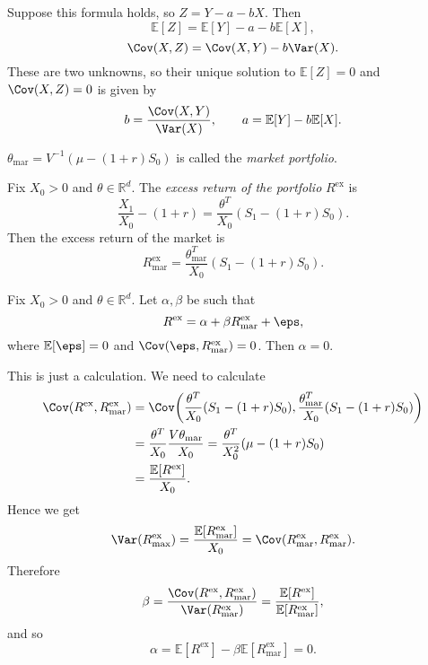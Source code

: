 \documentclass[12pt]{article}
\begin{document}
\begin{proofbox}
	Suppose this formula holds, so $Z = Y - a - bX$. Then
	\[
	\mathbb{E}[Z] = \mathbb{E}[Y] - a - b \mathbb{E}[X],
	\]
	\[
	\Cov(X, Z) = \Cov(X, Y) - b \Var(X).
	\]
	These are two unknowns, so their unique solution to $\mathbb{E}[Z] = 0$ and $\Cov(X, Z) = 0$ is given by
	\[
	b = \frac{\Cov(X, Y)}{\Var(X)}, \qquad a = \mathbb{E}[Y] - b \mathbb{E}[X].
	\]
\end{proofbox}

\begin{definition}
	$\theta_{\mathrm{mar}} = V^{-1}(\mu - (1+r)S_0)$ is called the \emph{market portfolio}.
\end{definition}

\begin{definition}
	Fix $X_0 > 0$ and $\theta \in \mathbb{R}^{d}$. The \emph{excess return of the portfolio} $R^{\mathrm{ex}}$ is
	\[
	\frac{X_1}{X_0} - (1+r) = \frac{\theta^{T}}{X_0}(S_1 - (1+r)S_0).
	\]
	Then the excess return of the market is
	\[
		R^{\mathrm{ex}}_{\mathrm{mar}} = \frac{\theta^{T}_{\mathrm{mar}}}{X_0}(S_1 - (1+r)S_0).
	\]
\end{definition}

\begin{theorem}
	Fix $X_0 > 0$ and $\theta \in \mathbb{R}^{d}$. Let $\alpha, \beta$ be such that
	\[
		R^{\mathrm{ex}} = \alpha + \beta R^{\mathrm{ex}}_{\mathrm{mar}} + \eps,
	\]
	where $\mathbb{E}[\eps] = 0$ and $\Cov(\eps, R^{\mathrm{ex}}_{\mathrm{mar}}) = 0$. Then $\alpha = 0$.
\end{theorem}


\begin{proofbox}
	This is just a calculation. We need to calculate
	\begin{align*}
	\Cov(R^{\mathrm{ex}}, R^{\mathrm{ex}}_{\mathrm{mar}}) &= \Cov \biggl( \frac{\theta^{T}}{X_0}(S_1 - (1+r)S_0), \frac{\theta^{T}_{\mathrm{mar}}}{X_0}(S_1-(1+r)S_0)\biggr) \\
											 &= \frac{\theta^{T}}{X_0}\frac{V \theta_{\mathrm{mar}}}{X_0} = \frac{\theta^{T}}{X_0^2} (\mu - (1+r)S_0) \\
											 &= \frac{\mathbb{E}[R^{\mathrm{ex}}]}{X_0}.
	\end{align*}
	Hence we get
	\[
	\Var(R^{\mathrm{ex}}_{\mathrm{max}}) = \frac{\mathbb{E}[R^{\mathrm{ex}}_{\mathrm{mar}}]}{X_0} = \Cov(R^{\mathrm{ex}}_{\mathrm{mar}}, R^{\mathrm{ex}}_{\mathrm{mar}}).
	\]
	Therefore
	\[
	\beta = \frac{\Cov(R^{\mathrm{ex}}, R^{\mathrm{ex}}_{\mathrm{mar}})}{\Var(R^{\mathrm{ex}}_{\mathrm{mar}})} = \frac{\mathbb{E}[R^{\mathrm{ex}}]}{\mathbb{E}[R^{\mathrm{ex}}_{\mathrm{mar}}]},
	\]
	and so
	\[
	\alpha = \mathbb{E}[R^{\mathrm{ex}}] - \beta \mathbb{E}[R^{\mathrm{ex}}_{\mathrm{mar}}] = 0.
	\]
\end{proofbox}
\end{document}
